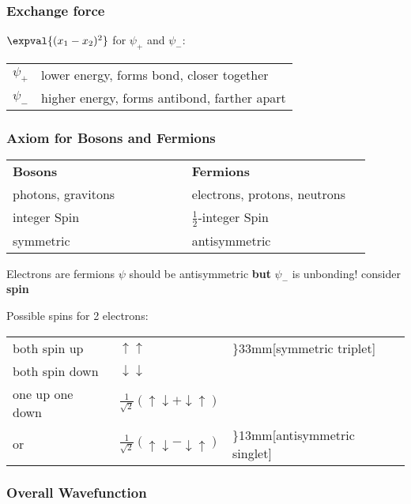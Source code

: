 \documentclass[10pt,a4paper]{scrartcl}
\begin{document}
\begin{multicols*}{3}
	\subsubsection{Exchange force}
	
	
	$\expval{(x_1-x_2)^2}$ for $\psi_+$ and $\psi_-$:
	
	\small
	\begin{tabular}{ll}
	$\psi_+$&lower energy, forms bond, closer together\\
	$\psi_-$&higher energy, forms antibond, farther apart
	\end{tabular}
	\normalsize
	
	\subsubsection{Axiom for Bosons and Fermions}
	\small
	\begin{tabular}{p{0.45\linewidth}| p{0.45\linewidth}}
	\textbf{Bosons} & \textbf{Fermions}\\
	photons, gravitons & electrons, protons, neutrons\\
	integer Spin & $\frac{1}{2}$-integer Spin\\
	symmetric  & antisymmetric
	\end{tabular}
		
	\finn	
	
	\scriptsize
	Electrons are fermions \dahe $\psi$ should be antisymmetric \textbf{but} $\psi_-$ is unbonding! \dahe consider \textbf{spin}
	\normalsize

	\finn
	
	Possible spins for 2 electrons:	

	\small
	\begin{tabular}{lll}
	both spin up&$\uparrow\uparrow$&\rdelim\}{3}{3mm}[symmetric triplet]\\
	both spin down&$\downarrow\downarrow$\\
	one up one down&$\frac{1}{\sqrt{2}}(\uparrow\downarrow+\downarrow\uparrow)$\\
	or	&$\frac{1}{\sqrt{2}}(\uparrow\downarrow-\downarrow\uparrow)$&\rdelim\}{1}{3mm}[antisymmetric singlet]
	\end{tabular}
	\normalsize
	
	\subsubsection{Overall Wavefunction}
	

\end{multicols*}
\end{document}
